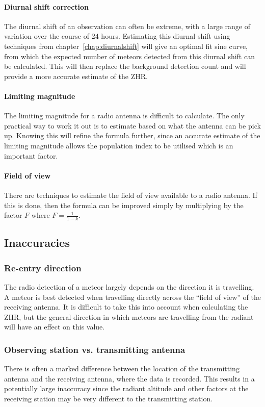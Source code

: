 \paragraph{Diurnal shift correction\\}
The diurnal shift of an observation can often be extreme, with a large range of variation over the course of 24 hours. Estimating this diurnal shift using techniques from chapter~\ref{chap:diurnalshift} will give an optimal fit sine curve, from which the expected number of meteors detected from this diurnal shift can be calculated. This will then replace the background detection count and will provide a more accurate estimate of the ZHR.
\paragraph{Limiting magnitude\\}
The limiting magnitude for a radio antenna is difficult to calculate. The only practical way to work it out is to estimate based on what the antenna can be pick up. Knowing this will refine the formula further, since an accurate estimate of the limiting magnitude allows the population index to be utilised which is an important factor.
\paragraph{Field of view\\}
There are techniques to estimate the field of view available to a radio antenna. If this is done, then the formula can be improved simply by multiplying by the factor $F$ where $F = \frac{1}{1-k}$.
\subsection{Inaccuracies}
\subsubsection{Re-entry direction}
The radio detection of a meteor largely depends on the direction it is travelling. A meteor is best detected when travelling directly across the ``field of view'' of the receiving antenna. It is difficult to take this into account when calculating the ZHR, but the general direction in which meteors are travelling from the radiant will have an effect on this value.
\subsubsection{Observing station vs. transmitting antenna}
There is often a marked difference between the location of the transmitting antenna and the receiving antenna, where the data is recorded. This results in a potentially large inaccuracy since the radiant altitude and other factors at the receiving station may be very different to the transmitting station.
